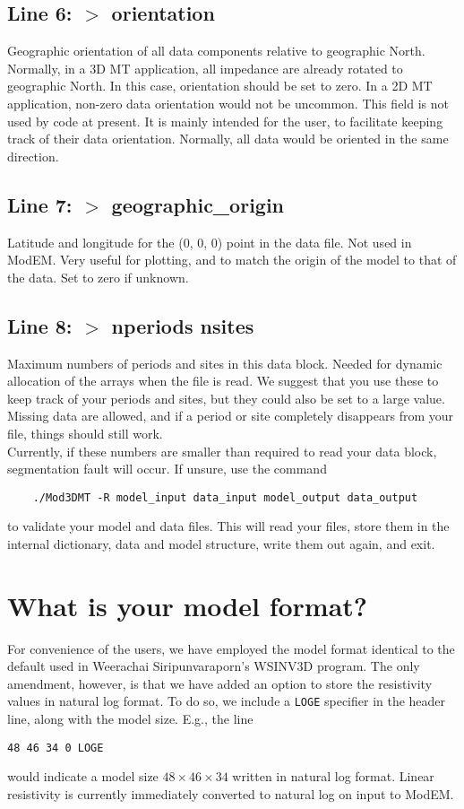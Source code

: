 \documentclass[12pt]{article}
\begin{document}
\subsection*{Line 6: $>$ orientation}
Geographic orientation of all data components relative to geographic North. Normally, in a 3D MT application, all impedance are already rotated to geographic North. In this case, orientation should be set to zero. In a 2D MT application, non-zero data orientation would not be uncommon. This field is not used by code at present. It is mainly intended for the user, to facilitate keeping track of their data orientation. Normally, all data would be oriented in the same direction.

\subsection*{Line 7: $>$ geographic\_origin}
Latitude and longitude for the (0, 0, 0) point in the data file. Not used in ModEM. Very useful for plotting, and to match the origin of the model to that of the data. Set to zero if unknown.

\subsection*{Line 8: $>$ nperiods nsites}
Maximum numbers of periods and sites in this data block. Needed for dynamic allocation of the arrays when the file is read. We suggest that you use these to keep track of your periods and sites, but they could also be set to a large value. Missing data are allowed, and if a period or site completely disappears from your file, things should still work.\\

Currently, if these numbers are smaller than required to read your data block, segmentation fault will occur. If unsure, use the command
\begin{verbatim}
    ./Mod3DMT -R model_input data_input model_output data_output
\end{verbatim}
to validate your model and data files. This will read your files, store them in the internal dictionary, data and model structure, write them out again, and exit.


\section{What is your model format?}

For convenience of the users, we have employed the model format identical to the default used in Weerachai Siripunvaraporn's WSINV3D program. The only amendment, however, is that we have added an option to store the resistivity values in natural log format. To do so, we include a \verb"LOGE" specifier in the header line, along with the model size. E.g., the line
\begin{verbatim}
48 46 34 0 LOGE    
\end{verbatim}
would indicate a model size $48 \times 46 \times 34$ written in natural log format. Linear resistivity is currently immediately converted to natural log on input to ModEM.\\
\end{document}
